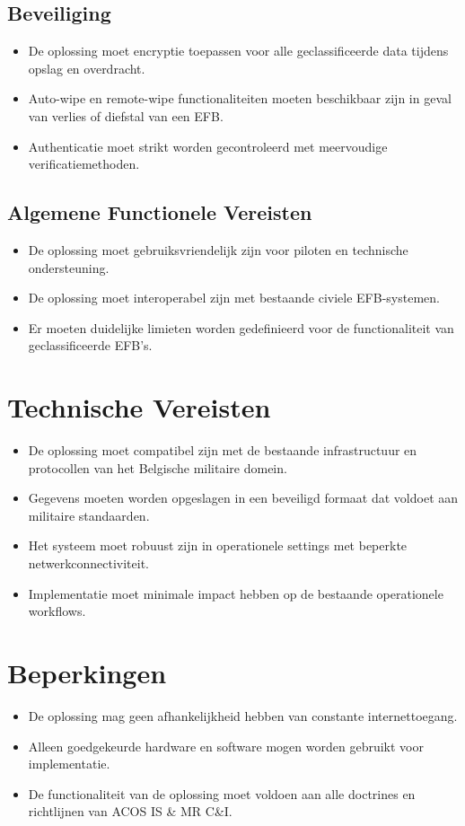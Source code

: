 \documentclass{hogent-article}
\begin{document}
    \subsection{Beveiliging}
    \begin{itemize}
        \item De oplossing moet encryptie toepassen voor alle geclassificeerde data tijdens opslag en overdracht.
        \item Auto-wipe en remote-wipe functionaliteiten moeten beschikbaar zijn in geval van verlies of diefstal van een EFB.
        \item Authenticatie moet strikt worden gecontroleerd met meervoudige verificatiemethoden.
    \end{itemize}
    
    \subsection{Algemene Functionele Vereisten}
    \begin{itemize}
        \item De oplossing moet gebruiksvriendelijk zijn voor piloten en technische ondersteuning.
        \item De oplossing moet interoperabel zijn met bestaande civiele EFB-systemen.
        \item Er moeten duidelijke limieten worden gedefinieerd voor de functionaliteit van geclassificeerde EFB's.
    \end{itemize}
    
    \section{Technische Vereisten}
    \begin{itemize}
        \item De oplossing moet compatibel zijn met de bestaande infrastructuur en protocollen van het Belgische militaire domein.
        \item Gegevens moeten worden opgeslagen in een beveiligd formaat dat voldoet aan militaire standaarden.
        \item Het systeem moet robuust zijn in operationele settings met beperkte netwerkconnectiviteit.
        \item Implementatie moet minimale impact hebben op de bestaande operationele workflows.
    \end{itemize}
    
    \section{Beperkingen}
    \begin{itemize}
        \item De oplossing mag geen afhankelijkheid hebben van constante internettoegang.
        \item Alleen goedgekeurde hardware en software mogen worden gebruikt voor implementatie.
        \item De functionaliteit van de oplossing moet voldoen aan alle doctrines en richtlijnen van ACOS IS \& MR C\&I.
    \end{itemize}
\end{document}
